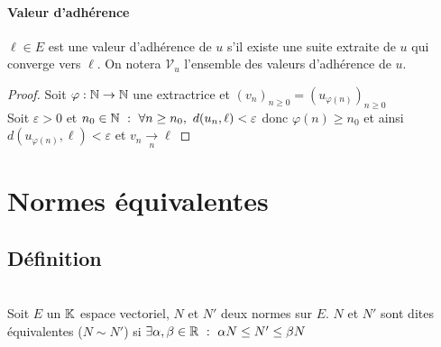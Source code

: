 		\paragraph{Valeur d'adhérence}
			$\ell\in E$ est une valeur d'adhérence de $u$ s'il existe une suite extraite de $u$ qui converge vers $\ell$.
			On notera $\mathcal{V}_u$ l'ensemble des valeurs d'adhérence de $u$. 
		\trait
		
		
		\begin{proof}
			Soit $\varphi : {\mathbb{N}} \rightarrow {\mathbb{N}}$ une extractrice et 
			$\left(v_n\right)_{n\geq 0} = \left(u_{\varphi (n)} \right)_{n\geq 0}$ \\
			Soit $\varepsilon >0$ et $ n_0 \in{\mathbb{N}} ~:~ \forall n\geq n_0 ,~d(u_n ,\ell)<\varepsilon$ 
			donc $\varphi (n) \geq n_0$ et ainsi $d\left( u_{\varphi (n)},\ell\right)<\varepsilon$ et $v_n \underset{n}{\rightarrow} \ell$
		\end{proof} \medskip

		 \medskip 


\section{Normes équivalentes}
	
	\subsection{Définition}
		
	\vspace{-15pt}
		\traitd \vspace{-7pt}~\\
			Soit $E$ un ${\mathbb{K}}$ espace vectoriel, $N$ et $N'$ deux normes sur $E$.
			$N$ et $N'$ sont dites \\équivalentes ($N\sim N'$) si $\exists \alpha ,\beta \in {\mathbb{R}} ~:~ \alpha N \leq N'\leq \beta N$
		\trait

		\vspace{-10pt}
		
		\label{1.3.1} \medskip
		
